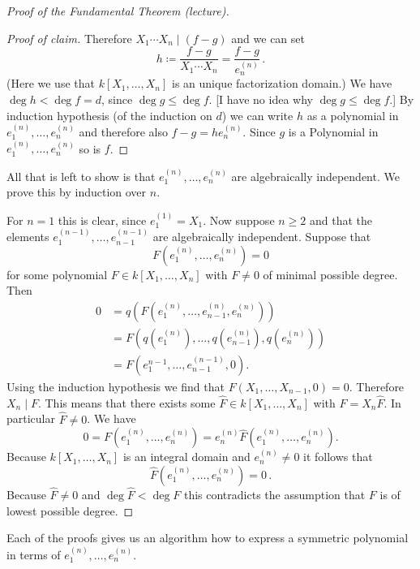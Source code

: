 \begin{proof}[Proof of the Fundamental Theorem (lecture)]
\begin{proof}[Proof of claim]
    Therefore $X_1 \dotsm X_n \mid (f-g)$ and we can set
    \[
                h
      \coloneqq \frac{f-g}{X_1 \dotsm X_n}
      =         \frac{f-g}{e^{(n)}_n} \,.
    \]
    (Here we use that $k[X_1, \dotsc, X_n]$ is an unique factorization domain.)
    We have $\deg h < \deg f = d$, since $\deg g \leq \deg f$.
    [I have no idea why $\deg g \leq \deg f$.]
    By induction hypothesis (of the induction on $d$) we can write $h$ as a polynomial in $e^{(n)}_1, \dotsc, e^{(n)}_n$ and therefore also $f-g = h e^{(n)}_n$.
    Since $g$ is a Polynomial in $e^{(n)}_1, \dotsc, e^{(n)}_n$ so is $f$.
  \end{proof}
  All that is left to show is that $e^{(n)}_1, \dotsc, e^{(n)}_n$ are algebraically independent.
  We prove this by induction over $n$.
  
  For $n = 1$ this is clear, since $e^{(1)}_1 = X_1$.
  Now suppose $n \geq 2$ and that the elements $e^{(n-1)}_1, \dotsc, e^{(n-1)}_{n-1}$ are algebraically independent.
  Suppose that
  \[
      F\left(e^{(n)}_1, \dotsc, e^{(n)}_n\right)
    = 0
  \]
  for some polynomial $F \in k[X_1, \dotsc, X_n]$ with $F \neq 0$ of minimal possible degree.
  Then
  \begin{align*}
        0
    &=  q \left( F \left( e^{(n)}_1, \dotsc, e^{(n)}_{n-1}, e^{(n)}_n \right) \right) \\
    &=  F \left(
            q \left( e^{(n)}_1 \right), \dotsc, q \left( e^{(n)}_{n-1} \right), q \left( e^{(n)}_n \right)
          \right) \\
    &=  F \left( e^{n-1}_1, \dotsc, e^{(n-1)}_{n-1}, 0 \right).
  \end{align*}
  Using the induction hypothesis we find that $F(X_1, \dotsc, X_{n-1}, 0) = 0$.
  Therefore $X_n \mid F$.
  This means that there exists some $\hat{F} \in k[X_1, \dotsc, X_n]$ with $F = X_n \hat{F}$.
  In particular $\hat{F} \neq 0$.
  We have
  \[
      0
    = F\left( e^{(n)}_1, \dotsc, e^{(n)}_n \right)
    = e^{(n)}_n \hat{F}\left( e^{(n)}_1, \dotsc, e^{(n)}_n \right).
  \]
  Because $k[X_1, \dotsc, X_n]$ is an integral domain and $e^{(n)}_n \neq 0$ it follows that
  \[
      \hat{F}\left( e^{(n)}_1, \dotsc, e^{(n)}_n \right)
    = 0 \,.
  \]
  Because $\hat{F} \neq 0$ and $\deg \hat{F} < \deg F$ this contradicts the assumption that $F$ is of lowest possible degree.
\end{proof}


\begin{remark}
  Each of the proofs gives us an algorithm how to express a symmetric polynomial in terms of $e^{(n)}_1, \dotsc, e^{(n)}_n$.
\end{remark}


